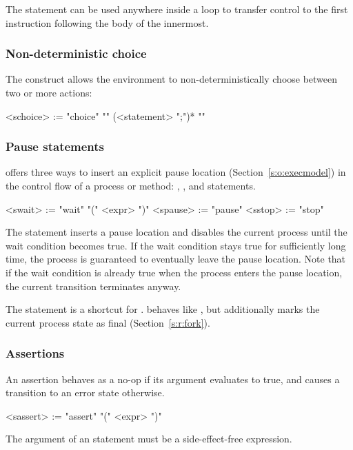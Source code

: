 The  statement can be used anywhere inside a loop to 
transfer control to the first instruction following the body of 
the innermost.

\subsubsection{Non-deterministic choice}  The  construct 
allows the environment to non-deterministically choose between
two or more actions:
\begin{bnflisting}
<schoice> := "choice" "{"
               (<statement> ";")*
             "}"
\end{bnflisting}

\subsubsection{Pause statements}\label{s:r:pause}

\tsl offers three ways to insert an explicit pause location 
(Section~\ref{s:o:execmodel}) in the control flow of a process or 
method: , , and 
statements.
\begin{bnflisting}
<swait>  := "wait" "(" <expr> ")"
<spause> := "pause"
<sstop>  := "stop"
\end{bnflisting}

The  statement inserts a pause location and disables the 
current process until the wait condition becomes true.  If the 
wait condition stays true for sufficiently long time, the process 
is guaranteed to eventually leave the pause location.  Note that 
if the wait condition is already true when the process enters the 
pause location, the current transition terminates anyway.

The  statement is a shortcut for .  
 behaves like , but additionally marks the 
current process state as final (Section~\ref{s:r:fork}).

\subsubsection{Assertions} 

An assertion behaves as a no-op if its argument evaluates to true, 
and causes a transition to an error
state otherwise.
\begin{bnflisting}
<sassert> := "assert" "(" <expr> ")"
\end{bnflisting}
The argument of an  statement must be a 
side-effect-free expression.

